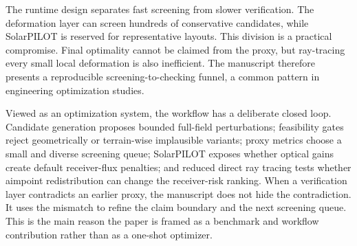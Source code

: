 \documentclass[final,3p,times]{elsarticle}
\begin{document}
The runtime design separates fast screening from slower verification. The deformation layer can screen hundreds of conservative candidates, while SolarPILOT is reserved for representative layouts. This division is a practical compromise. Final optimality cannot be claimed from the proxy, but ray-tracing every small local deformation is also inefficient. The manuscript therefore presents a reproducible screening-to-checking funnel, a common pattern in engineering optimization studies.

Viewed as an optimization system, the workflow has a deliberate closed loop. Candidate generation proposes bounded full-field perturbations; feasibility gates reject geometrically or terrain-wise implausible variants; proxy metrics choose a small and diverse screening queue; SolarPILOT exposes whether optical gains create default receiver-flux penalties; and reduced direct ray tracing tests whether aimpoint redistribution can change the receiver-risk ranking. When a verification layer contradicts an earlier proxy, the manuscript does not hide the contradiction. It uses the mismatch to refine the claim boundary and the next screening queue. This is the main reason the paper is framed as a benchmark and workflow contribution rather than as a one-shot optimizer.
\end{document}
